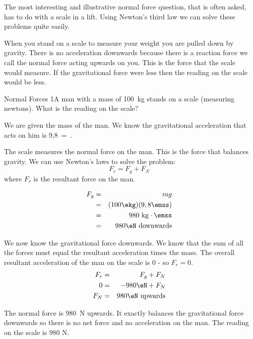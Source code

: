 The most interesting and illustrative normal force question, that is often asked, has to do with a scale in a lift. Using Newton's third law we can solve these problems quite easily.

When you stand on a scale to measure your weight you are pulled down by gravity. There is no acceleration downwards because there is a reaction force we call the normal force acting upwards on you. This is the force that the scale would measure. If the gravitational force were less then the reading on the scale would be less.

\begin{wex}{Normal Forces 1}{A man with a mass of 100~kg stands on a scale
(measuring newtons). What is the reading on the scale?}

{ We are given the mass of the man. We know the gravitational acceleration that acts on him is 9,8~=~\mss .

The scale measures the normal force on the man. This is the force that
balances gravity. We can use Newton's laws to solve the problem:
\begin{equation*}
F_r=F_g+F_N
\end{equation*}
where $F_r$ is the resultant force on the man.

\begin{eqnarray*}
F_g&=&mg \\
&=& (100\ekg)(9,8\emss)\\
&=& 980\ \mathrm{kg\cdot\emss} \\
&=& 980\eN\ \mathrm{downwards}
\end{eqnarray*}

We now know the gravitational force downwards. We know that the sum of all the forces must equal the resultant acceleration times the mass. The overall resultant acceleration of the man on the scale is $0$ - so $F_r=0$.
\begin{eqnarray*}
F_r&=&F_g+F_N \\
0 &=& -980\eN+F_N\\
F_N &=& 980\eN\ \mathrm{upwards}
\end{eqnarray*}

The normal force is 980~N upwards. It exactly balances the gravitational force downwards so there is no net force and no acceleration on the man. The reading on the scale is 980 N.}
\end{wex}

